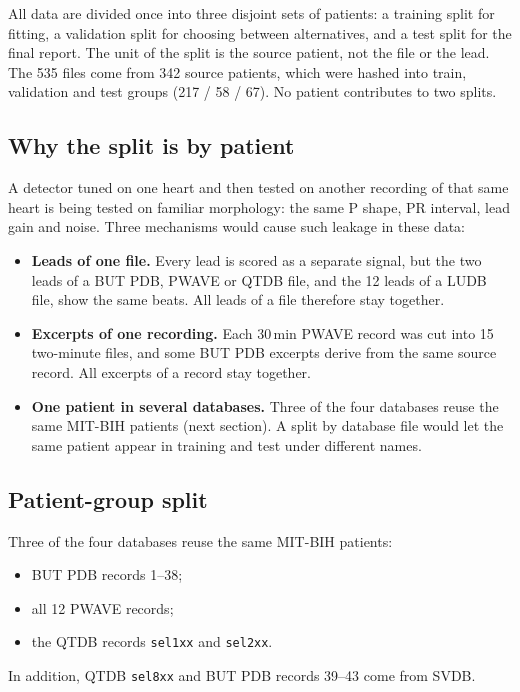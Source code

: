 \documentclass[11pt,a4paper]{article}
\newcommand{\code}[1]{\texttt{#1}}
\begin{document}
All data are divided once into three disjoint sets of patients: a training split for fitting, a validation split for choosing between alternatives, and a test split for the final report. The unit of the split is the source patient, not the file or the lead. The 535 files come from 342 source patients, which were hashed into train, validation and test groups (217 / 58 / 67). No patient contributes to two splits.

\subsection{Why the split is by patient}

A detector tuned on one heart and then tested on another recording of that same heart is being tested on familiar morphology: the same P shape, PR interval, lead gain and noise. Three mechanisms would cause such leakage in these data:
\begin{itemize}
\item \textbf{Leads of one file.} Every lead is scored as a separate signal, but the two leads of a BUT PDB, PWAVE or QTDB file, and the 12 leads of a LUDB file, show the same beats. All leads of a file therefore stay together.
\item \textbf{Excerpts of one recording.} Each 30\,min PWAVE record was cut into 15 two-minute files, and some BUT PDB excerpts derive from the same source record. All excerpts of a record stay together.
\item \textbf{One patient in several databases.} Three of the four databases reuse the same MIT-BIH patients (next section). A split by database file would let the same patient appear in training and test under different names.
\end{itemize}

\subsection{Patient-group split}

Three of the four databases reuse the same MIT-BIH patients:
\begin{itemize}
\item BUT PDB records 1--38;
\item all 12 PWAVE records;
\item the QTDB records \code{sel1xx} and \code{sel2xx}.
\end{itemize}
In addition, QTDB \code{sel8xx} and BUT PDB records 39--43 come from SVDB.
\end{document}
